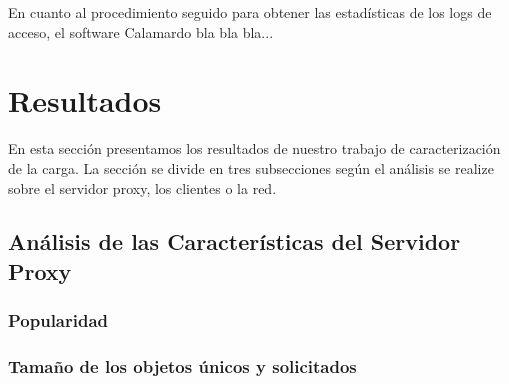 \documentclass[twocolumn,twoside]{Jornadas}
\begin{document}
En cuanto al procedimiento seguido para obtener las estadísticas de los logs de acceso, el software Calamardo bla bla bla...


\section{Resultados}
\label{resultados}

En esta sección presentamos los resultados de nuestro trabajo de caracterización de la carga. La sección se divide en tres subsecciones según el análisis se realize sobre el servidor proxy, los clientes o la red.

\subsection{Análisis de las Características del Servidor Proxy}
\label{servidores}

\subsubsection{Popularidad}
\label{popularidad}

\subsubsection{Tamaño de los objetos únicos y solicitados}
\label{unicos_solicitados}
\end{document}
